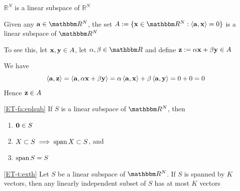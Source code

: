 \begin{frame}

    \vspace{2em}
    \Eg 
    $\mathbb{R}^{N}$ is a linear subspace of $\mathbb{R}^{N}$
    
    \vspace{.7em}
    \Eg 
    Given any $\bolda \in \RR^N$, the set $A := \setntn{\boldx \in
    \RR^N}{\inner{\bolda, \boldx}  = 0}$
    is a linear subspace of $\RR^N$
    
    \vspace{2em}
    To see this, let ${\mathbf x}, {\mathbf y} \in A$, let $\alpha, \beta \in \RR$ and 
    define ${\mathbf z} := \alpha {\mathbf x} + \beta {\mathbf y} \in A$
    
    We have 
        $$
        \left\langle{ {\mathbf a} ,  {\mathbf z} }\right\rangle =
        \left\langle{ {\mathbf a} , \alpha  {\mathbf x} + \beta  {\mathbf y} }\right\rangle 
        = \alpha \left\langle{  {\mathbf a} ,  {\mathbf x} }\right\rangle
        + \beta \left\langle{ {\mathbf a} ,  {\mathbf y} }\right\rangle = 0 + 0 = 0
        $$
    Hence ${\mathbf z}\in A$


\end{frame}

\begin{frame}

    \vspace{.7em}
    \Fact\eqref{ET-fa:eplsub}
    If $S$ is a linear subspace of $\RR^N$, then
    \begin{enumerate}
        \item ${\mathbf 0} \in S$
        \item $X \subset S \implies \operatorname{span} X \subset S$, and
        \item $\operatorname{span} S = S$
    \end{enumerate}
    \vspace{2em}
    
    \Thm\eqref{ET-t:exth}
    Let $S$ be a linear subspace of $\RR^N$. If $S$ is spanned by $K$ vectors,
    then any linearly independent subset of $S$ has at most $K$
    vectors
    
\end{frame}


